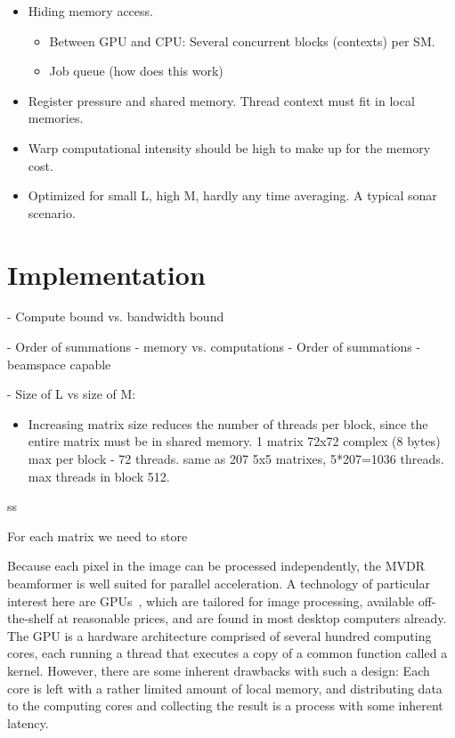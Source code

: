 \documentclass[12pt,journal,captionsoff,onecolumn]{IEEEtran}
\newcommand\1{\vec 1}
\begin{document}
\begin{itemize}
\item Hiding memory access.
\begin{itemize}
\item Between GPU and CPU: Several concurrent blocks (contexts) per SM.
\item Job queue (how does this work)
\end{itemize}
\item Register pressure and shared memory. Thread context must fit in local memories.
\item Warp computational intensity should be high to make up for the memory cost.
\item Optimized for small L, high M, hardly any time averaging. A typical sonar scenario.
\end{itemize}




\section{Implementation}

- Compute bound vs. bandwidth bound

- Order of summations - memory vs. computations
- Order of summations - beamspace capable

- Size of L vs size of M:

\begin{itemize}
\item Increasing matrix size reduces the number of threads per block, since the entire matrix must be in shared memory. 1 matrix 72x72 complex (8 bytes) max per block - 72 threads. same as 207 5x5 matrixes, 5*207=1036 threads. max threads in block 512.
\end{itemize}ss

For each matrix we need to store 

Because each pixel in the image can be processed independently, the \gls{MVDR} beamformer is well suited for parallel acceleration. A technology of particular interest here are \glspl{GPU}~\cite{Nilsen2009}, which are tailored for image processing, available off-the-shelf at reasonable prices, and are found in most desktop computers already. The \gls{GPU} is a hardware architecture comprised of several hundred computing cores, each running a thread that executes a copy of a common function called a kernel.  However, there are some inherent drawbacks with such a design: Each core is left with a rather limited amount of local memory, and distributing data to the computing cores and collecting the result is a process with some inherent latency.
\end{document}
